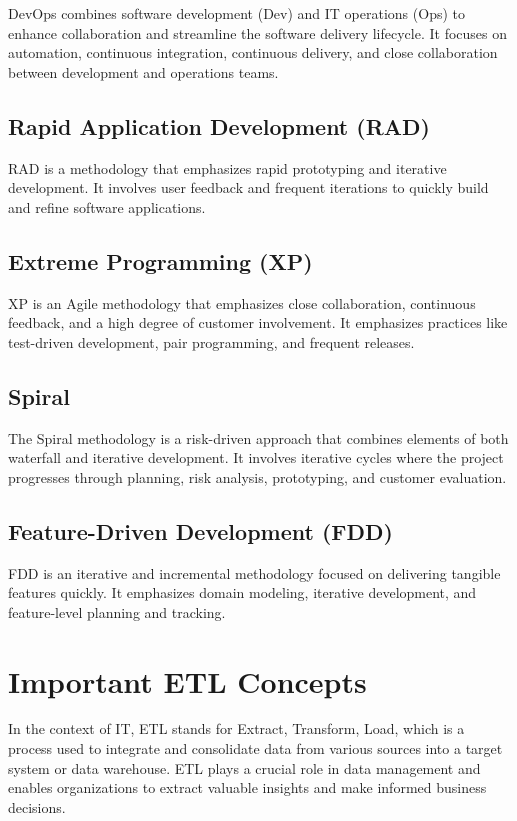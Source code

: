 \documentclass[]{report}
\begin{document}
DevOps combines software development (Dev) and IT operations (Ops) to enhance collaboration and streamline the software delivery lifecycle. It focuses on automation, continuous integration, continuous delivery, and close collaboration between development and operations teams.

\section{Rapid Application Development (RAD)}

RAD is a methodology that emphasizes rapid prototyping and iterative development. It involves user feedback and frequent iterations to quickly build and refine software applications.

\section{Extreme Programming (XP)}

XP is an Agile methodology that emphasizes close collaboration, continuous feedback, and a high degree of customer involvement. It emphasizes practices like test-driven development, pair programming, and frequent releases.

\section{Spiral}

The Spiral methodology is a risk-driven approach that combines elements of both waterfall and iterative development. It involves iterative cycles where the project progresses through planning, risk analysis, prototyping, and customer evaluation.

\section{Feature-Driven Development (FDD)}

FDD is an iterative and incremental methodology focused on delivering tangible features quickly. It emphasizes domain modeling, iterative development, and feature-level planning and tracking.

\chapter{Important ETL Concepts}

In the context of IT, ETL stands for Extract, Transform, Load, which is a process used to integrate and consolidate data from various sources into a target system or data warehouse. ETL plays a crucial role in data management and enables organizations to extract valuable insights and make informed business decisions.
\end{document}
